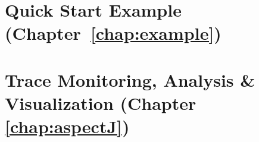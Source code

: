 \section{Quick Start Example (Chapter~\ref{chap:example})}\label{sec:appendix:manualInstrumentation:output}

\newpage

\newpage	
\section{Trace Monitoring, Analysis \& Visualization (Chapter \ref{chap:aspectJ})}%
\label{sec:appendix:exampleConsoleOutputs:aspectJExample}
